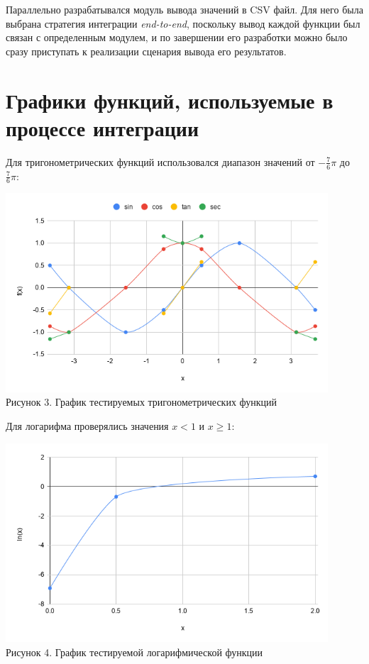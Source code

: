 \documentclass[listings]{labreport}
\begin{document}
Параллельно разрабатывался модуль вывода значений в CSV файл. Для него была выбрана стратегия интеграции
\textit{end-to-end}, поскольку вывод каждой функции был связан с определенным модулем, и по завершении его
разработки можно было сразу приступать к реализации сценария вывода его результатов.

\section*{Графики функций, используемые в процессе интеграции}

Для тригонометрических функций использовался диапазон значений от $-\frac{7}{6}\pi$ до $\frac{7}{6}\pi$:

\begin{center}
\includegraphics[width=0.9\textwidth]{Lab2_trig_plot.png}\\
Рисунок 3. График тестируемых тригонометрических функций
\end{center}

\newpage
Для логарифма проверялись значения $x < 1$ и $x \geqslant 1$:

\begin{center}
\includegraphics[width=0.9\textwidth]{Lab2_ln_plot.png}\\
Рисунок 4. График тестируемой логарифмической функции
\end{center}
\end{document}
